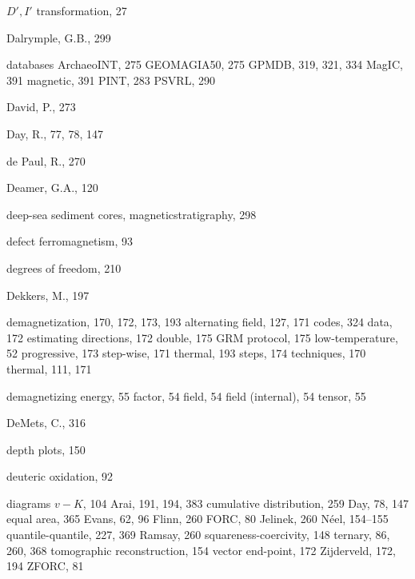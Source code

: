 \documentclass[,plain]{tauxe}
\begin{document}
\begin{theindex}
  \indexspace
   \item $D', I'$ transformation, 27
  \item Dalrymple, G.B., 299
  \item databases
    \subitem ArchaeoINT, 275
    \subitem GEOMAGIA50, 275
    \subitem GPMDB, 319, 321, 334
    \subitem MagIC, 391
    \subitem magnetic, 391
    \subitem PINT, 283
    \subitem PSVRL, 290
  \item David, P., 273
  \item Day, R., 77, 78, 147
  \item de Paul, R., 270
  \item Deamer, G.A., 120
  \item deep-sea sediment cores, magnetic\break stratigraphy, 298
  \item defect ferromagnetism, 93
  \item degrees of freedom, 210
  \item Dekkers, M., 197
  \item demagnetization, 170, 172, 173, 193
    \subitem alternating field, 127, 171
     \subitem codes, 324
    \subitem data, 172
      \subsubitem estimating directions, 172
\subitem double, 175
    \subitem GRM protocol, 175
    \subitem low-temperature, 52
    \subitem progressive, 173
    \subitem step-wise, 171
    \subsubitem thermal, 193
    \subitem steps, 174
     \subitem techniques, 170
    \subitem thermal, 111, 171
  \item demagnetizing
    \subitem energy, 55
    \subitem factor, 54
    \subitem field, 54
    \subitem field (internal), 54
    \subitem tensor, 55
  \item DeMets, C., 316
  \item depth plots, 150
  \item deuteric oxidation, 92
  \item diagrams
    \subitem $v-K$, 104
    \subitem Arai, 191, 194, 383
    \subitem cumulative distribution, 259
    \subitem Day, 78, 147
    \subitem equal area, 365
    \subitem Evans, 62, 96
    \subitem Flinn, 260
    \subitem FORC, 80
    \subitem Jelinek, 260
   \subitem N\'eel, 154--155
    \subitem quantile-quantile, 227, 369
    \subitem Ramsay, 260
    \subitem squareness-coercivity, 148
    \subitem ternary, 86, 260, 368
	\subsubitem tomographic reconstruction, 154
     \subitem vector end-point, 172
    \subitem Zijderveld, 172, 194
	\subitem ZFORC, 81


\end{theindex}
\end{document}
